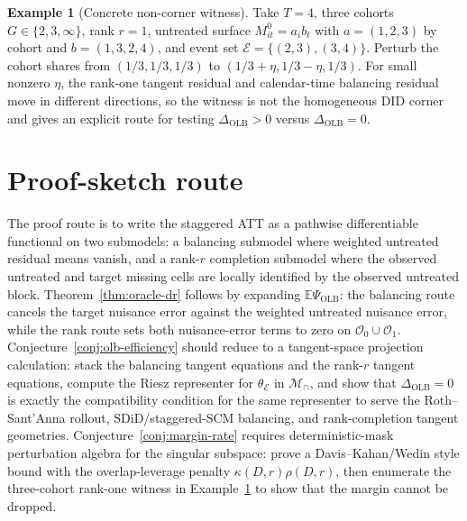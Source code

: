 \documentclass[11pt]{article}
\newcommand{\E}{\mathbb{E}}
\theoremstyle{definition}
\newtheorem{example}{Example}
\theoremstyle{plain}
\theoremstyle{remark}
\begin{document}
\begin{example}[Concrete non-corner witness]\label{ex:three-cohort-witness}
Take \(T=4\), three cohorts \(G\in\{2,3,\infty\}\), rank \(r=1\), untreated surface \(M^0_{it}=a_i b_t\) with \(a=(1,2,3)\) by cohort and \(b=(1,3,2,4)\), and event set \(\mathcal{E}=\{(2,3),(3,4)\}\).  Perturb the cohort shares from \((1/3,1/3,1/3)\) to \((1/3+\eta,1/3-\eta,1/3)\).  For small nonzero \(\eta\), the rank-one tangent residual and calendar-time balancing residual move in different directions, so the witness is not the homogeneous DID corner and gives an explicit route for testing \(\Delta_{\mathrm{OLB}}>0\) versus \(\Delta_{\mathrm{OLB}}=0\).
\end{example}

\section{Proof-sketch route}
The proof route is to write the staggered ATT as a pathwise differentiable functional on two submodels: a balancing submodel where weighted untreated residual means vanish, and a rank-\(r\) completion submodel where the observed untreated and target missing cells are locally identified by the observed untreated block.  Theorem~\ref{thm:oracle-dr} follows by expanding \(\E\Psi_{\mathrm{OLB}}\): the balancing route cancels the target nuisance error against the weighted untreated nuisance error, while the rank route sets both nuisance-error terms to zero on \(\mathcal{O}_0\cup\mathcal{O}_1\).  Conjecture~\ref{conj:olb-efficiency} should reduce to a tangent-space projection calculation: stack the balancing tangent equations and the rank-\(r\) tangent equations, compute the Riesz representer for \(\theta_{\mathcal{E}}\) in \(\mathcal{M}_{\cap}\), and show that \(\Delta_{\mathrm{OLB}}=0\) is exactly the compatibility condition for the same representer to serve the Roth--Sant'Anna rollout, SDiD/staggered-SCM balancing, and rank-completion tangent geometries.  Conjecture~\ref{conj:margin-rate} requires deterministic-mask perturbation algebra for the singular subspace: prove a Davis--Kahan/Wedin style bound with the overlap-leverage penalty \(\kappa(D,r)\rho(D,r)\), then enumerate the three-cohort rank-one witness in Example~\ref{ex:three-cohort-witness} to show that the margin cannot be dropped.
\end{document}
